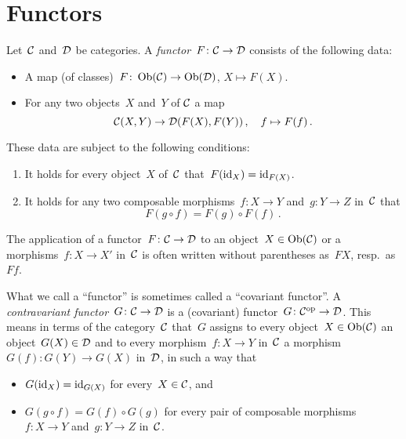 \section{Functors}


\begin{definition}
  Let~$\mathcal{C}$ and~$\mathcal{D}$ be categories.
  A \emph{functor}~$F \colon \mathcal{C} \to \mathcal{D}$ consists of the following data:
  \begin{itemize}
    \item
      A map (of classes)~$F \colon \operatorname{Ob}(\mathcal{C}) \to \operatorname{Ob}(\mathcal{D})$, $X \mapsto F(X)$.
    \item
      For any two objects~$X$ and~$Y$ of $\mathcal{C}$ a map
      \[
                \mathcal{C}(X, Y)
        \to     \mathcal{D}(F(X), F(Y)) \,,
        \quad   f
        \mapsto F(f) \,.
      \]
  \end{itemize}
  These data are subject to the following conditions:
  \begin{enumerate}[label=(F\arabic*)]
    \item
      It holds for every object~$X$ of~$\mathcal{C}$ that~$F(\mathrm{id}_X) = \mathrm{id}_{F(X)}$.
    \item
      It holds for any two composable morphisms~$f \colon X \to Y$ and~$g \colon Y \to Z$ in~$\mathcal{C}$ that
      \[
          F(g \circ f)
        = F(g) \circ F(f) \,.
      \]
  \end{enumerate}
\end{definition}


\begin{notation*}
  The application of a functor~$F \colon \mathcal{C} \to \mathcal{D}$ to an object~$X \in \operatorname{Ob}(\mathcal{C})$ or a morphisms~$f \colon X \to X'$ in~$\mathcal{C}$ is often written without parentheses as~$FX$, resp.\ as~$Ff$.
\end{notation*}


\begin{remark}
  What we call a \enquote{functor} is sometimes called a \enquote{covariant functor}.
  A \emph{contravariant functor}~$G \colon \mathcal{C} \to \mathcal{D}$ is a (covariant) functor~$G \colon \mathcal{C}^{\mathrm{op}} \to \mathcal{D}$.
  This means in terms of the category~$\mathcal{C}$ that~$G$ assigns to every object~$X \in \operatorname{Ob}(\mathcal{C})$ an object~$G(X) \in \mathcal{D}$ and to every morphism~$f \colon X \to Y$ in~$\mathcal{C}$ a morphism~$G(f) \colon G(Y) \to G(X)$ in~$\mathcal{D}$, in such a way that
  \begin{itemize}
    \item
      $G(\mathrm{id}_X) = \mathrm{id}_{G(X)}$ for every~$X \in \mathcal{C}$, and
    \item
      $G(g \circ f) = G(f) \circ G(g)$ for every pair of composable morphisms~$f \colon X \to Y$ and~$g \colon Y \to Z$ in~$\mathcal{C}$.
  \end{itemize}
\end{remark}


